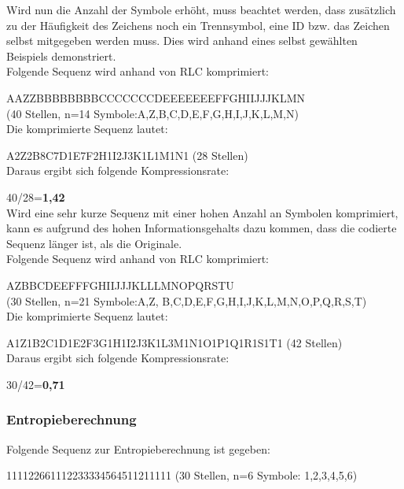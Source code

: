 \documentclass[12pt,german]{article}
\begin{document}
Wird nun die Anzahl der Symbole erhöht, muss beachtet werden, dass zusätzlich zu der Häufigkeit des Zeichens noch ein Trennsymbol, eine ID bzw. das Zeichen selbst mitgegeben werden muss. Dies wird anhand eines selbst gewählten Beispiels demonstriert.\\

Folgende Sequenz wird anhand von RLC komprimiert:

AAZZBBBBBBBBCCCCCCCDEEEEEEEFFGHIIJJJKLMN\\ (40 Stellen, n=14 Symbole:A,Z,B,C,D,E,F,G,H,I,J,K,L,M,N)\\

Die komprimierte Sequenz lautet:

A2Z2B8C7D1E7F2H1I2J3K1L1M1N1 (28 Stellen)\\

Daraus ergibt sich folgende Kompressionsrate:

40/28=\textbf{1,42}\\

Wird eine sehr kurze Sequenz mit einer hohen Anzahl an Symbolen komprimiert, kann es aufgrund des hohen Informationsgehalts dazu kommen, dass die codierte Sequenz länger ist, als die Originale.\\


Folgende Sequenz wird anhand von RLC komprimiert:

AZBBCDEEFFFGHIIJJJKLLLMNOPQRSTU\\ (30 Stellen, n=21 Symbole:A,Z, B,C,D,E,F,G,H,I,J,K,L,M,N,O,P,Q,R,S,T)\\

Die komprimierte Sequenz lautet:

A1Z1B2C1D1E2F3G1H1I2J3K1L3M1N1O1P1Q1R1S1T1 (42 Stellen)\\

Daraus ergibt sich folgende Kompressionsrate:

30/42=\textbf{0,71}\\

\subsubsection{Entropieberechnung}
Folgende Sequenz zur Entropieberechnung ist gegeben:

111122661112233334564511211111 (30 Stellen, n=6 Symbole: 1,2,3,4,5,6)\\
\end{document}
